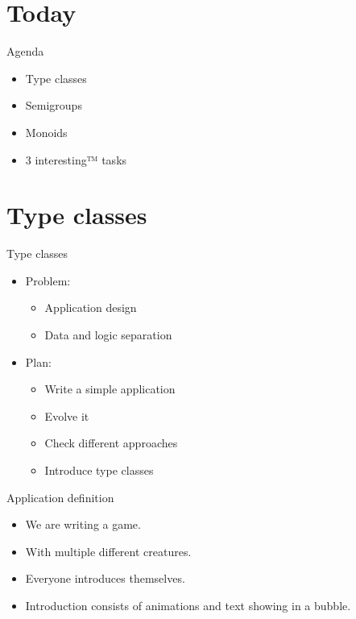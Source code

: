 \documentclass[presentation,aspectratio=169,smaller]{beamer}
\begin{document}
\section*{Today}
\label{sec:org9269b6c}

\begin{frame}[label={sec:orge38eede}]{Agenda}
\begin{itemize}
\item Type classes
\item Semigroups
\item Monoids
\item 3 interesting™ tasks
\end{itemize}
\end{frame}

\section*{Type classes}
\label{sec:orgbaff058}

\begin{frame}[label={sec:orge2d46c2}]{Type classes}
\begin{itemize}
\item Problem:
\begin{itemize}
\item Application design
\item Data and logic separation
\end{itemize}
\item Plan:
\begin{itemize}
\item Write a simple application
\item Evolve it
\item Check different approaches
\item Introduce type classes
\end{itemize}
\end{itemize}
\end{frame}

\begin{frame}[label={sec:org5854fe1}]{Application definition}
\begin{itemize}
\item We are writing a game.
\item With multiple different creatures.
\item Everyone introduces themselves.
\item Introduction consists of animations and text showing in a bubble.
\end{itemize}
\end{frame}
\end{document}
